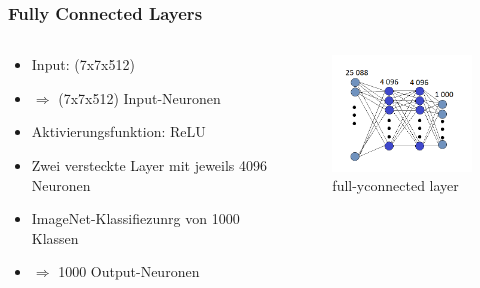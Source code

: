 \documentclass[10pt]{beamer}
\begin{document}
\begin{frame}
\frametitle{Fully Connected Layers}
\begin{columns}
	\begin{column}{.5\textwidth}
		\begin{itemize}
			\setlength\itemsep{1em}
			\item Input: (7x7x512)
			\item[] $\Rightarrow$ (7x7x512) Input-Neuronen
			\item Aktivierungsfunktion: ReLU
			\item Zwei versteckte Layer mit jeweils 4096 Neuronen
			\item ImageNet-Klassifiezunrg von 1000 Klassen
			\item[] $\Rightarrow$ 1000 Output-Neuronen
		\end{itemize}
	\end{column}

	\begin{column}{.5\textwidth}
		\begin{figure}
			\includegraphics[width=50mm]{full_connected.png}
			\caption{full-yconnected layer}
		\end{figure}
	\end{column}

\end{columns}
\end{frame}
\end{document}
